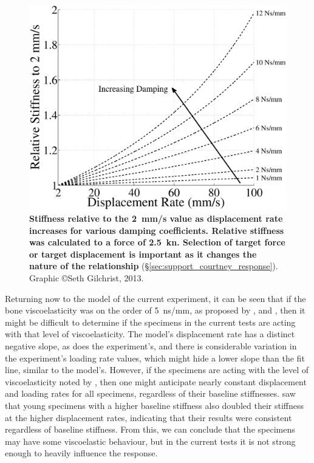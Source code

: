 \begin{figure}
\centering
\includegraphics[width=0.7\linewidth]{./behave_fail/Figures/courtneyDamping}
\caption[Stiffness \acs*{vs} displacement rate and damping]{\textbf{Stiffness relative to the 2~\ac{mm}/\ac{s} value as displacement rate increases for various damping coefficients. Relative stiffness was calculated to a force of 2.5~\ac{kn}. Selection of target force or target displacement is important as it changes the nature of the relationship} (\S\ref{sec:support_courtney_response}). Graphic \copyright Seth Gilchrist, 2013.}
\label{fig:courtneyDamping}
\end{figure}

Returning now to the model of the current experiment, it can be seen that if the bone viscoelasticity was on the order of 5~\ac{n}\ac{s}/\ac{mm}, as proposed by \citet{carter_compressive_1977}, \citet{linde_mechanical_1991} and \citet{crowninshield_response_1974}, then it might be difficult to determine if the specimens in the current tests are acting with that level of viscoelasticity.
The model's displacement rate has a distinct negative slope, as does the experiment's, and there is considerable variation in the experiment's loading rate values, which might hide a lower slope than the fit line, similar to the model's.
However, if the specimens are acting with the level of viscoelasticity noted by \citet{courtney_effects_1994}, then one might anticipate nearly constant displacement and loading rates for all specimens, regardless of their baseline stiffnesses.
\citet{courtney_effects_1994} saw that young specimens with a higher baseline stiffness also doubled their stiffness at the higher displacement rates, indicating that their results were consistent regardless of baseline stiffness.
From this, we can conclude that the specimens may have some viscoelastic behaviour, but in the current tests it is not strong enough to heavily influence the response.

